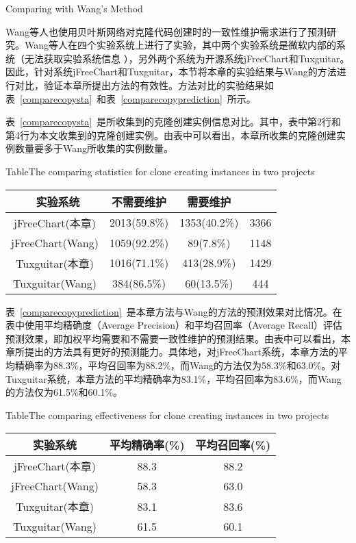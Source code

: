 {Comparing with Wang’s Method}

Wang等人也使用贝叶斯网络对克隆代码创建时的一致性维护需求进行了预测研究\cite{wang2014predicting}。Wang等人在四个实验系统上进行了实验，其中两个实验系统是微软内部的系统（无法获取实验系统信息 ），另外两个系统为开源系统jFreeChart和Tuxguitar。因此，针对系统jFreeChart和Tuxguitar，本节将本章的实验结果与Wang的方法进行对比，验证本章所提出方法的有效性。方法对比的实验结果如表~\ref{comparecopysta}~和表~\ref{comparecopyprediction}~所示。

表~\ref{comparecopysta}~是所收集到的克隆创建实例信息对比。其中，表中第2行和第4行为本文收集到的克隆创建实例。由表中可以看出，本章所收集的克隆创建实例数量要多于Wang所收集的实例数量。

\begin{table}[htbp]
{Table$\!$}{The comparing statistics for clone creating instances in two projects}
\vspace{0.5em}
\centering
\wuhao
\begin{tabular}{cccc}
\toprule[1.5pt]
~{实验系统}&{不需要维护} &{需要维护} & ~\\
\midrule[1pt]
jFreeChart(本章)&	2013(59.8\%)&	1353(40.2\%)&	3366\\
jFreeChart(Wang)&1059(92.2\%)&	89(7.8\%)&	1148\\
Tuxguitar(本章)&	1016(71.1\%)&	413(28.9\%)&	1429\\
Tuxguitar(Wang)&384(86.5\%)&	60(13.5\%)&	444\\
\bottomrule[1.5pt]
\end{tabular}
\end{table}

表~\ref{comparecopyprediction}~是本章方法与Wang的方法的预测效果对比情况。在表中使用平均精确度（Average Precision）和平均召回率（Average Recall）评估预测效果，即加权平均需要和不需要一致性维护的预测结果。由表中可以看出，本章所提出的方法具有更好的预测能力。具体地，对jFreeChart系统，本章方法的平均精确率为88.3\%，平均召回率为88.2\%，而Wang的方法仅为58.3\%和63.0\%。对Tuxguitar系统，本章方法的平均精确率为83.1\%，平均召回率为83.6\%，而Wang的方法仅为61.5\%和60.1\%。

\begin{table}[htbp]
{Table$\!$}{The comparing effectiveness for clone creating instances in two projects}
\vspace{0.5em}
\centering
\wuhao
\begin{tabular}{ccc}
\toprule[1.5pt]
{实验系统}&{平均精确率(\%)} &{平均召回率(\%)}\\ 
\midrule[1pt]
jFreeChart(本章)&	88.3& 88.2\\
jFreeChart(Wang)&58.3&	63.0\\
Tuxguitar(本章)&	83.1&	83.6\\
Tuxguitar(Wang)&61.5&	60.1\\
\bottomrule[1.5pt]
\end{tabular}
\end{table}

